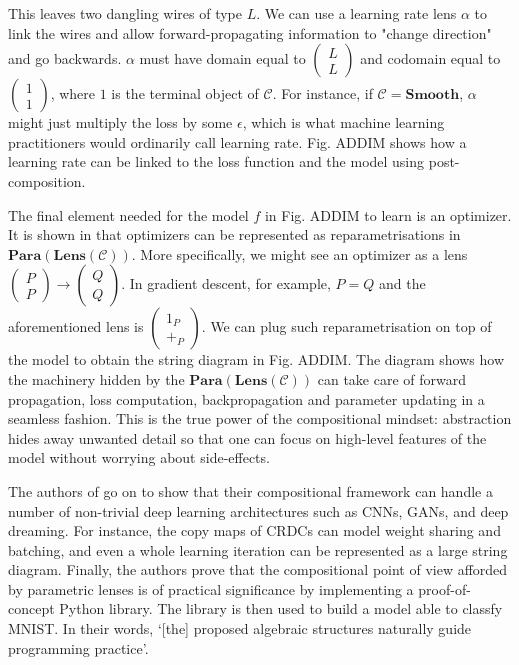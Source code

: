\documentclass[11pt,a4paper,openright,twoside]{report}
\theoremstyle{plain}
\theoremstyle{definition}
\begin{document}
This leaves two dangling wires of type $L$. We can use a learning rate lens $\alpha$ to link the wires and allow forward-propagating information to "change direction" and go backwards. $\alpha$ must have domain equal to $\left( \begin{smallmatrix} L \\ L \end{smallmatrix} \right)$ and codomain equal to $\left(\begin{smallmatrix} 1 \\ 1 \end{smallmatrix}\right)$, where $1$ is the terminal object of $\mathcal{C}$. For instance, if $\mathcal{C} = \mathbf{Smooth}$, $\alpha$ might just multiply the loss by some $\epsilon$, which is what machine learning practitioners would ordinarily call learning rate. Fig. ADDIM shows how a learning rate can be linked to the loss function and the model using post-composition.


The final element needed for the model $f$ in Fig. ADDIM to learn is an optimizer. It is shown in \cite{cruttwellDeepLearningParametric} that optimizers can be represented as reparametrisations in $\mathbf{Para}(\mathbf{Lens}(\mathcal{C}))$. More specifically, we might see an optimizer as a lens $\left( \begin{smallmatrix} P \\ P \end{smallmatrix} \right) \to \left( \begin{smallmatrix} Q \\ Q \end{smallmatrix} \right)$. In gradient descent, for example, $P = Q$ and the aforementioned lens is $\left( \begin{smallmatrix} 1_P \\ +_P \end{smallmatrix} \right)$. We can plug such reparametrisation on top of the model to obtain the string diagram in Fig. ADDIM. The diagram shows how the machinery hidden by the $\mathbf{Para}(\mathbf{Lens}(\mathcal{C}))$ can take care of forward propagation, loss computation, backpropagation and parameter updating in a seamless fashion. This is the true power of the compositional mindset: abstraction hides away unwanted detail so that one can focus on high-level features of the model without worrying about side-effects.


The authors of \cite{cruttwellDeepLearningParametric} go on to show that their compositional framework can handle a number of non-trivial deep learning architectures such as CNNs, GANs, and deep dreaming. For instance, the copy maps of CRDCs can model weight sharing and batching, and even a whole learning iteration can be represented as a large string diagram. Finally, the authors prove that the compositional point of view afforded by parametric lenses is of practical significance by implementing a proof-of-concept Python library. The library is then used to build a model able to classfy MNIST. In their words, \lq[the] proposed algebraic structures naturally guide programming practice\rq.
\end{document}
